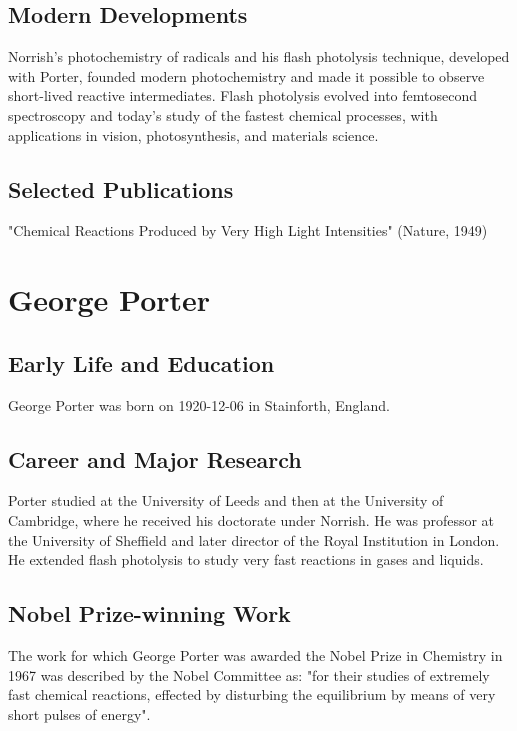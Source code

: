 \subsection*{Modern Developments}

Norrish's photochemistry of radicals and his flash photolysis technique, developed with Porter, founded modern photochemistry and made it possible to observe short-lived reactive intermediates. Flash photolysis evolved into femtosecond spectroscopy and today's study of the fastest chemical processes, with applications in vision, photosynthesis, and materials science.

\subsection*{Selected Publications}

"Chemical Reactions Produced by Very High Light Intensities" (Nature, 1949)

\clearpage

\section{George Porter}

\subsection*{Early Life and Education}

George Porter was born on 1920-12-06 in Stainforth, England.

\subsection*{Career and Major Research}

Porter studied at the University of Leeds and then at the University of Cambridge, where he received his doctorate under Norrish. He was professor at the University of Sheffield and later director of the Royal Institution in London. He extended flash photolysis to study very fast reactions in gases and liquids.

\subsection*{Nobel Prize-winning Work}

The work for which George Porter was awarded the Nobel Prize in Chemistry in 1967 was described by the Nobel Committee as: "for their studies of extremely fast chemical reactions, effected by disturbing the equilibrium by means of very short pulses of energy".

